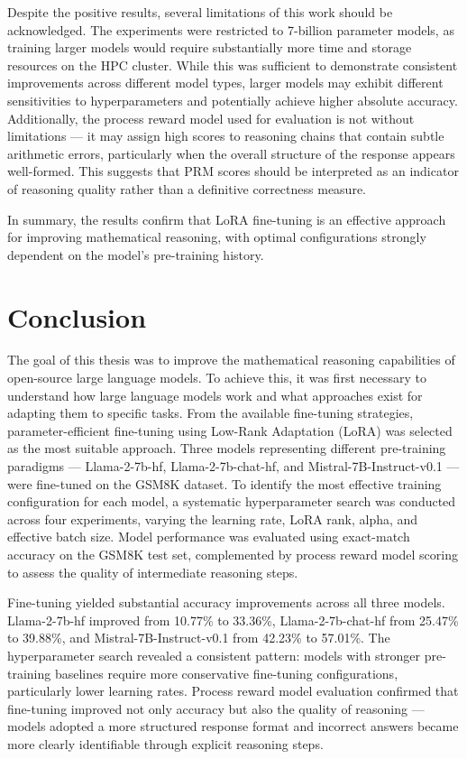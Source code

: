   Despite the positive results, several limitations
  of this work should be acknowledged. The
  experiments were restricted to 7-billion
  parameter models, as training larger models would
  require substantially more time and storage
  resources on the HPC cluster. While this was
  sufficient to demonstrate consistent improvements
  across different model types, larger models may
  exhibit different sensitivities to hyperparameters
  and potentially achieve higher absolute accuracy.
  Additionally, the process reward model used for
  evaluation is not without limitations --- it may assign
  high scores to reasoning chains that contain
  subtle arithmetic errors, particularly when the
  overall structure of the response appears
  well-formed. This suggests that PRM scores
  should be interpreted as an indicator of
  reasoning quality rather than a definitive
  correctness measure.

  In summary, the results confirm that LoRA fine-tuning is an
  effective approach for improving mathematical reasoning, with
  optimal configurations strongly dependent on the model's
  pre-training history.


\chapter{Conclusion}
\label{chap:conclusion}
The goal of this thesis was to improve the
  mathematical reasoning capabilities of
  open-source large language models. To
  achieve this, it was first necessary to
  understand how large language models work
  and what approaches exist for adapting them
  to specific tasks. From the available
  fine-tuning strategies, parameter-efficient
  fine-tuning using Low-Rank Adaptation (LoRA)
  was selected as the most suitable approach. Three models
  representing different pre-training paradigms
  --- Llama-2-7b-hf, Llama-2-7b-chat-hf, and
  Mistral-7B-Instruct-v0.1 --- were fine-tuned
  on the GSM8K dataset. To identify the most effective training
  configuration for each model, a systematic
  hyperparameter search was conducted across
  four experiments, varying the learning rate,
  LoRA rank, alpha, and effective batch size.
  Model performance was evaluated using
  exact-match accuracy on the GSM8K test set,
  complemented by process reward model scoring
  to assess the quality of intermediate reasoning
  steps.

  Fine-tuning yielded substantial accuracy
  improvements across all three models.
  Llama-2-7b-hf improved from 10.77\% to
  33.36\%, Llama-2-7b-chat-hf from 25.47\%
  to 39.88\%, and Mistral-7B-Instruct-v0.1
  from 42.23\% to 57.01\%. The hyperparameter
  search revealed a consistent pattern: models
  with stronger pre-training baselines require
  more conservative fine-tuning configurations,
  particularly lower learning rates. Process
  reward model evaluation confirmed that
  fine-tuning improved not only accuracy but
  also the quality of reasoning --- models
  adopted a more structured response format
  and incorrect answers became more clearly
  identifiable through explicit reasoning steps.

